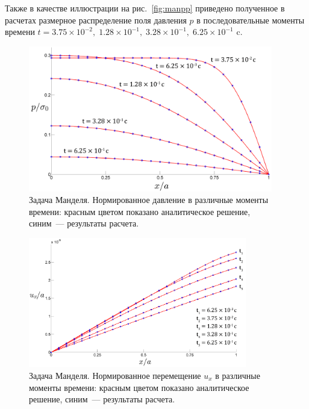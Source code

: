 Также в качестве иллюстрации на рис.~\ref{fig:manpp} приведено полученное в расчетах размерное распределение
поля давления $p$ в последовательные моменты времени
$t = 3.75 \times 10^{-2},\; 1.28\times 10^{-1}, \; 3.28\times 10^{-1},\; 6.25\times 10^{-1}$ c.

%
\begin{figure}[t!]
\centering
\includegraphics[width=0.95\textwidth]{./figs/pp0M.png}
\caption{Задача Манделя. Нормированное давление в различные моменты времени: красным цветом показано
аналитическое решение, синим~--- результаты расчета.}\label{fig:manp}
\end{figure}
% 
%
\begin{figure}[h!]
\centering
\includegraphics[width=0.85\textwidth]{./figs/uux0M.png}
\caption{ Задача Манделя. Нормированное перемещение $u_x$ в различные моменты времени: красным цветом показано
аналитическое решение, синим~--- результаты расчета.}\label{fig:manux}
\end{figure}
%
%
